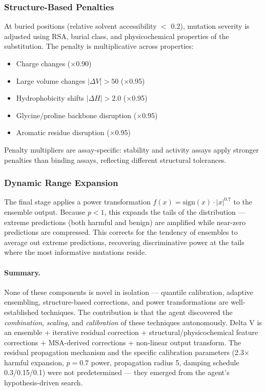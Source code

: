 \documentclass[11pt,a4paper]{article}
\begin{document}
\subsubsection{Structure-Based Penalties}

At buried positions (relative solvent accessibility $<$ 0.2), mutation severity is adjusted using RSA, burial class, and physicochemical properties of the substitution. The penalty is multiplicative across properties:

\begin{itemize}
    \item Charge changes ($\times$0.90)
    \item Large volume changes $|\Delta V| > 50$ ($\times$0.95)
    \item Hydrophobicity shifts $|\Delta H| > 2.0$ ($\times$0.95)
    \item Glycine/proline backbone disruption ($\times$0.95)
    \item Aromatic residue disruption ($\times$0.95)
\end{itemize}

Penalty multipliers are assay-specific: stability and activity assays apply stronger penalties than binding assays, reflecting different structural tolerances.

\subsubsection{Dynamic Range Expansion}

The final stage applies a power transformation $f(x) = \text{sign}(x) \cdot |x|^{0.7}$ to the ensemble output. Because $p < 1$, this expands the tails of the distribution --- extreme predictions (both harmful and benign) are amplified while near-zero predictions are compressed. This corrects for the tendency of ensembles to average out extreme predictions, recovering discriminative power at the tails where the most informative mutations reside.

\paragraph{Summary.}
None of these components is novel in isolation --- quantile calibration, adaptive ensembling, structure-based corrections, and power transformations are well-established techniques. The contribution is that the agent discovered the \emph{combination}, \emph{scaling}, and \emph{calibration} of these techniques autonomously. Delta V is an ensemble + iterative residual correction + structural/physicochemical feature corrections + MSA-derived corrections + non-linear output transform. The residual propagation mechanism and the specific calibration parameters (2.3$\times$ harmful expansion, $p = 0.7$ power, propagation radius 5, damping schedule 0.3/0.15/0.1) were not predetermined --- they emerged from the agent's hypothesis-driven search.
\end{document}
